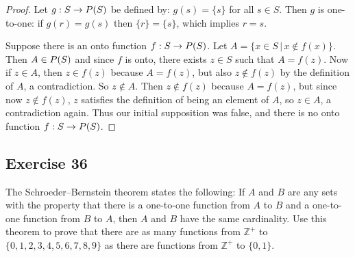 \documentclass[14pt]{extarticle}
\let\mathscr\relax
\newcommand{\ps}{\mathscr{P}} %
\newcommand{\Z}{\mathbb{Z}}
\begin{document}
\begin{proof}
    Let \(g: S \to \ps(S)\) be defined by: \(g(s) = \{s\}\) for all \(s \in S\). Then $g$ is one-to-one: if \(g(r) = g(s)\)
    then \(\{r\} = \{s\}\), which implies $r = s$.

    Suppose there is an onto function \(f: S \to \ps(S)\). Let \(A = \{x\in S\,|\, x\notin f(x)\}\). Then \(A \in \ps(S)\)
    and since $f$ is onto, there exists \(z \in S\) such that \(A = f(z)\). Now if \(z \in A\), then \(z \in f(z)\)
    because \(A = f(z)\), but also \(z \notin f(z)\) by the definition of $A$, a contradiction. So \(z \notin A\). Then
    \(z \notin f(z)\) because \(A = f(z)\), but since now \(z \notin f(z)\), $z$ satisfies the definition of being an
    element of $A$, so \(z \in A\), a contradiction again. Thus our initial supposition was false, and there is no onto function \(f: S \to \ps(S)\).
\end{proof}

\subsection{Exercise 36}
The Schroeder–Bernstein theorem states the following: If $A$ and $B$ are any sets with the property that there is a
one-to-one function from $A$ to $B$ and a one-to-one function from $B$ to $A$, then $A$ and $B$ have the same
cardinality. Use this theorem to prove that there are as many functions from \(\Z^+\) to \(\{0, 1, 2, 3, 4, 5, 6, 7,
8, 9\}\) as there are functions from \(\Z^+\) to \(\{0, 1\}\).
\end{document}
